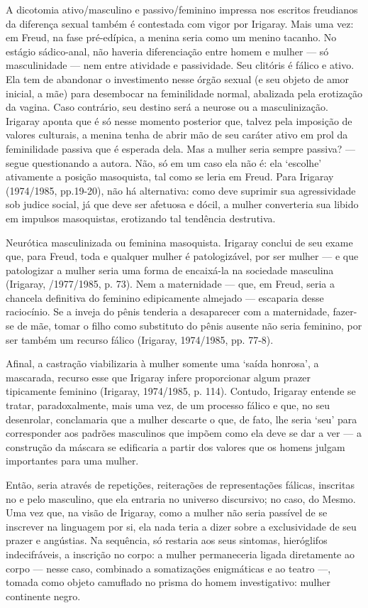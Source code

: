 A dicotomia ativo/masculino e passivo/feminino impressa nos escritos
freudianos da diferença sexual também é contestada com vigor por
Irigaray. Mais uma vez: em Freud, na fase pré-edípica, a menina seria
como um menino tacanho. No estágio sádico-anal, não haveria
diferenciação entre homem e mulher --- só masculinidade --- nem entre
atividade e passividade. Seu clitóris é fálico e ativo. Ela tem de
abandonar o investimento nesse órgão sexual (e seu objeto de amor
inicial, a mãe) para desembocar na feminilidade normal, abalizada pela
erotização da vagina. Caso contrário, seu destino será a neurose ou a
masculinização. Irigaray aponta que é só nesse momento posterior que,
talvez pela imposição de valores culturais, a menina tenha de abrir mão
de seu caráter ativo em prol da feminilidade passiva que é esperada
dela. Mas a mulher seria sempre passiva? --- segue questionando a autora.
Não, só em um caso ela não é: ela `escolhe' ativamente a posição
masoquista, tal como se leria em Freud. Para Irigaray (1974/1985,
pp.19-20), não há alternativa: como deve suprimir sua agressividade sob
judice social, já que deve ser afetuosa e dócil, a mulher converteria
sua libido em impulsos masoquistas, erotizando tal tendência destrutiva.

Neurótica masculinizada ou feminina masoquista. Irigaray conclui de seu
exame que, para Freud, toda e qualquer mulher é patologizável, por ser
mulher --- e que patologizar a mulher seria uma forma de encaixá-la na
sociedade masculina (Irigaray, /1977/1985, p. 73). Nem a maternidade ---
que, em Freud, seria a chancela definitiva do feminino edipicamente
almejado --- escaparia desse raciocínio. Se a inveja do pênis tenderia a
desaparecer com a maternidade, fazer-se de mãe, tomar o filho como
substituto do pênis ausente não seria feminino, por ser também um
recurso fálico (Irigaray, 1974/1985, pp. 77-8).

Afinal, a castração viabilizaria à mulher somente uma `saída honrosa', a
mascarada, recurso esse que Irigaray infere proporcionar algum prazer
tipicamente feminino (Irigaray, 1974/1985, p. 114). Contudo, Irigaray
entende se tratar, paradoxalmente, mais uma vez, de um processo fálico e
que, no seu desenrolar, conclamaria que a mulher descarte o que, de
fato, lhe seria `seu' para corresponder aos padrões masculinos que
impõem como ela deve se dar a ver --- a construção da máscara se
edificaria a partir dos valores que os homens julgam importantes para
uma mulher.

Então, seria através de repetições, reiterações de representações
fálicas, inscritas no e pelo masculino, que ela entraria no universo
discursivo; no caso, do Mesmo. Uma vez que, na visão de Irigaray, como a
mulher não seria passível de se inscrever na linguagem por si, ela nada
teria a dizer sobre a exclusividade de seu prazer e angústias. Na
sequência, só restaria aos seus sintomas, hieróglifos indecifráveis, a
inscrição no corpo: a mulher permaneceria ligada diretamente ao corpo
--- nesse caso, combinado a somatizações enigmáticas e ao teatro ---,
tomada como objeto camuflado no prisma do homem investigativo: mulher
continente negro.

